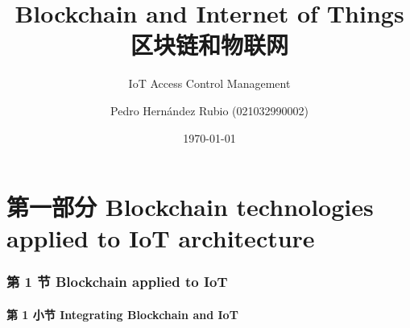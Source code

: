 \documentclass[
    aspectratio=169,                   %
]{beamer}
\begin{document}
    \title{Blockchain and Internet of Things 区块链和物联网}  %
    \subtitle{IoT Access Control Management}         %
    \author{Pedro Hernández Rubio (021032990002)}                  %
    \date{\today}                          %
    \maketitle                             %

\part{第一部分 Blockchain technologies applied to IoT architecture}

\AtBeginSection[]{
    \begin{frame}
        \sectionpage                   %
    \end{frame}
}


\section{第 1 节 Blockchain applied to IoT}

\subsection{第 1 小节 Integrating Blockchain and IoT}
\end{document}
